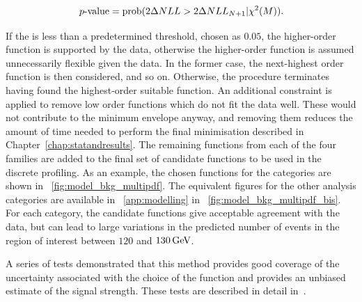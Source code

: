 $$ \text{\ensuremath{\,p{\text{-value}}}} = \text{prob}(2 \Delta NLL > 2 \Delta NLL_{N+1}| \chi^2(M)). $$

If the \pvalue is less than a predetermined threshold, chosen as $0.05$, the higher-order function is supported by the data, otherwise the higher-order function is assumed unnecessarily flexible given the data. In the former case, the next-highest order function is then considered, and so on. Otherwise, the procedure terminates having found the highest-order suitable function. An additional constraint is applied to remove low order functions which do not fit the data well. These would not contribute to the minimum envelope anyway, and removing them reduces the amount of time needed to perform the final minimisation described in Chapter~\ref{chap:statandresults}. The remaining functions from each of the four families are added to the final set of candidate functions to be used in the discrete profiling. As an example, the chosen functions for the \Untagged categories are shown in \Fig~\ref{fig:model_bkg_multipdf}. The equivalent figures for the other analysis categories are available in \App~\ref{app:modelling} in \Fig~\ref{fig:model_bkg_multipdf_bis}. For each category, the candidate functions give acceptable agreement with the data, but can lead to large variations in the predicted number of events in the region of interest between $120$ and $130\,\text{Ge\hspace{-.08em}V}$. %

A series of tests demonstrated that this method provides good coverage of the uncertainty associated with the choice of the function and provides an unbiased estimate of the signal strength. These tests are described in detail in~\cite{DiscreteProfiling}. 

